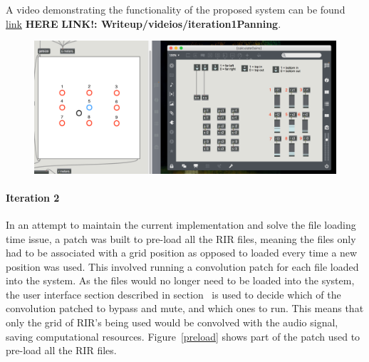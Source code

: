\documentclass[../../main.tex]{subfiles}
\begin{document}
		 	A video demonstrating the functionality of the proposed system can be found \href{run:./././SupportingFiles/Webpage/pages/video.html}{link} \textbf{HERE} \textbf{LINK!: Writeup/videios/iteration1Panning}.

			\begin{figure}[H]
				\centerline{\includegraphics[scale = 0.45]{Sections/Implementation/Max/images/Max/iteration1/panning_edit2.png}}
				\caption{}
				\label{iteration1Panning}
			\end{figure}



		 \paragraph{Iteration 2}

		 	In an attempt to maintain the current implementation and solve the file loading time issue, a patch was built to pre-load all the \ac{RIR} files, meaning the files only had to be associated with a grid position as opposed to loaded every time a new position was used. This involved running a convolution patch for each file loaded into the system. As the files would no longer need to be loaded into the system, the user interface section described in section~ is used to decide which of the convolution patched to bypass and mute, and which ones to run. This means that only the grid of \ac{RIR}'s being used would be convolved with the audio signal, saving computational resources. Figure~\ref{preload} shows part of the patch used to pre-load all the \ac{RIR} files.
\end{document}
